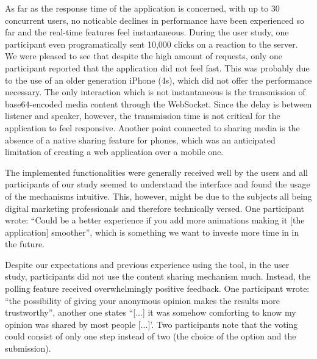 As far as the response time of the application is concerned, with up to 30 concurrent users, no noticable declines in performance have been experienced so far and the real-time features feel instantaneous. During the user study, one participant even programatically sent 10,000 clicks on a reaction to the server. We were pleased to see that despite the high amount of requests, only one participant reported that the application did not feel fast. This was probably due to the use of an older generation iPhone (4s), which did not offer the performance necessary. 
The only interaction which is not instantaneous is the transmission of base64-encoded media content through the WebSocket. Since the delay is between listener and speaker, however, the transmission time is not critical for the application to feel responsive. Another point connected to sharing media is the absence of a native sharing feature for phones, which was an anticipated limitation of creating a web application over a mobile one.

The implemented functionalities were generally received well by the users and all participants of our study seemed to understand the interface and found the usage of the mechanisms intuitive. This, however, might be due to the subjects all being digital marketing professionals and therefore technically versed. One participant wrote: ``Could be a better experience if you add more animations making it [the application] smoother'', which is something we want to investe more time in in the future.

Despite our expectations and previous experience using the tool, in the user study, participants did not use the content sharing mechanism much. Instead, the polling feature received overwhelmingly positive feedback. One participant wrote: ``the possibility of giving your anonymous opinion makes the results more trustworthy'', another one states ``[...] it was somehow comforting to know my opinion was shared by most people [...]'. Two participants note that the voting could consist of only one step instead of two (the choice of the option and the submission).

